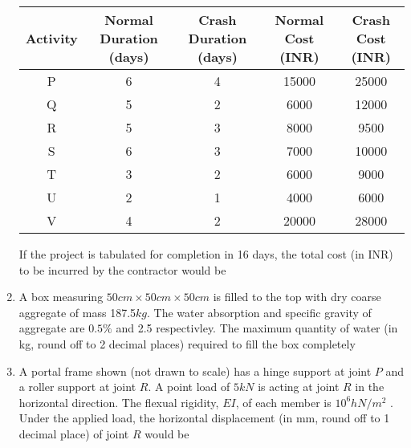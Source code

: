 \documentclass[journal,12pt,onecolumn]{IEEEtran}
\theoremstyle{remark}
\begin{document}
\begin{enumerate}
        \begin{tabular}{|c|c|c|c|c|}
                \hline
                Activity & Normal Duration (days) & Crash Duration (days) & Normal Cost (INR) & Crash Cost (INR)\\
                \hline
                P & 6 & 4 & 15000 & 25000\\
                \hline
                Q & 5 & 2 & 6000 & 12000\\
                \hline
                R & 5 & 3 & 8000 & 9500\\
                \hline
                S & 6 & 3 & 7000 & 10000\\
                \hline
                T & 3 & 2 & 6000 & 9000\\
                \hline
                U & 2 & 1 & 4000 & 6000\\
                \hline
                V & 4 & 2 & 20000 & 28000\\
                \hline

            

        \end{tabular}
        If the project is tabulated for completion in 16 days, the total cost (in INR) to be incurred 
        by the contractor would be
        \hfill{}
        
    \item A box measuring $50cm \times 50cm \times 50cm$ is filled to the top with dry coarse
        aggregate of mass 187.5$kg$. The water absorption and specific gravity of aggregate are 
        $0.5\%$ and 2.5 respectivley. The maximum quantity of water (in kg, round off to 2 decimal places)
        required to fill the box completely
        \hfill{}
         
    \item A portal frame shown (not drawn to scale) has a hinge support at joint $P$ and a roller
        support at joint $R$. A point load of $5kN$ is acting at joint $R$ in the horizontal direction. 
        The flexual rigidity, $EI$, of each member is $10^6 hN/m^2$ . Under the applied load, the horizontal
        displacement (in mm, round off to 1 decimal place) of joint $R$ would be
        \begin{center}
            \resizebox{0.5\textwidth}{!}{
                
            } 
        \end{center}
        \hfill{}

    
\end{enumerate}
\end{document}
